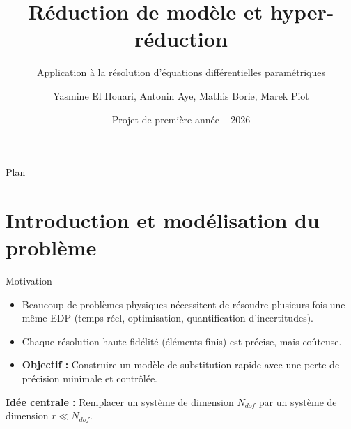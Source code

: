 \documentclass[aspectratio=169]{beamer}
\title{Réduction de modèle et hyper-réduction}
\subtitle{Application à la résolution d'équations différentielles paramétriques}
\author[Y. El Houari, A. Aye, M. Borie, M. Piot]{Yasmine El Houari, Antonin Aye, Mathis Borie, Marek Piot}
\institute{École Nationale des Ponts et Chaussées}
\date{Projet de première année -- 2026}
\begin{document}
\begin{frame}
    \titlepage
\end{frame}

\begin{frame}{Plan}
    \tableofcontents[
        sectionstyle=show/show,
        subsectionstyle=hide
    ]
\end{frame}

\section{Introduction et modélisation du problème}

\begin{frame}{Motivation}
\begin{itemize}
    \item Beaucoup de problèmes physiques nécessitent de résoudre plusieurs fois une même EDP (temps réel, optimisation, quantification d'incertitudes).
    \item Chaque résolution haute fidélité (éléments finis) est précise, mais coûteuse.
    \item \textbf{Objectif :} Construire un modèle de substitution rapide avec une perte de précision minimale et contrôlée.
\end{itemize}

\vspace{0.5cm}
\centering
\textbf{Idée centrale :} Remplacer un système de dimension $N_{dof}$ par un système de dimension $r \ll N_{dof}$.
\end{frame}
\end{document}
